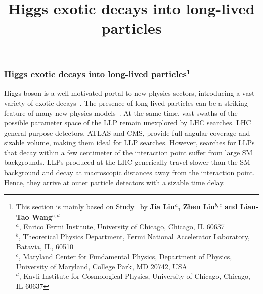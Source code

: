 \title{
Higgs exotic decays into long-lived particles
}



\subsubsection{Higgs exotic decays into long-lived particles\footnote{
This section is mainly based on Study~\cite{Liu:2018wte} by
{\bf Jia Liu$^a$, Zhen Liu$^{b,c}$ and Lian-Tao Wang$^{a,d}$}\\
$^a$, {Enrico Fermi Institute, University of Chicago, Chicago, IL 60637}\\
$^b$, {Theoretical Physics Department, Fermi National Accelerator Laboratory, Batavia, IL, 60510}\\
$^c$, {Maryland Center for Fundamental Physics, Department of Physics, University of Maryland, College Park, MD 20742, USA
}\\
$^d$, {Kavli Institute for Cosmological Physics, University of Chicago, Chicago, IL 60637}
}}


Higgs boson is a well-motivated portal to new physics sectors, introducing a vast variety of exotic decays~\cite{Curtin:2013fra}.
The presence of long-lived particles can be a striking feature of many new physics models~\cite{Liu:2018wte,Barbier:2004ez,Giudice:1998bp,Meade:2010ji,Arvanitaki:2012ps,ArkaniHamed:2012gw,Liu:2015bma,Chacko:2005pe, Burdman:2006tz,Kang:2008ea,Craig:2015pha, Davoli:2017swj}. 
At the same time, vast swaths of the possible parameter space of the LLP remain unexplored by LHC searches.
LHC general purpose detectors, ATLAS and CMS, provide full angular coverage and sizable volume, making them ideal for LLP searches.
However, searches for LLPs that decay within a few centimeter of the interaction point suffer from large SM backgrounds. 
LLPs produced at the LHC generically travel slower than the SM background and decay at macroscopic distances away from the interaction point. Hence, they arrive at outer particle detectors with a sizable time delay. 

